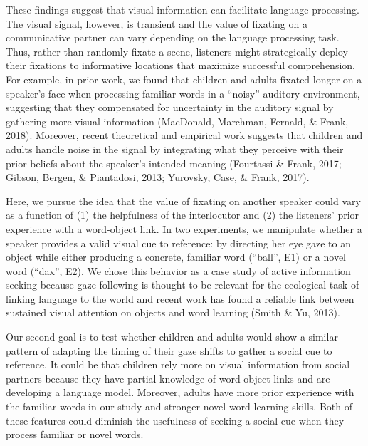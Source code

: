 \documentclass[10pt, letterpaper]{article}
\begin{document}
These findings suggest that visual information can facilitate language
processing. The visual signal, however, is transient and the value of
fixating on a communicative partner can vary depending on the language
processing task. Thus, rather than randomly fixate a scene, listeners
might strategically deploy their fixations to informative locations that
maximize successful comprehension. For example, in prior work, we found
that children and adults fixated longer on a speaker's face when
processing familiar words in a ``noisy'' auditory environment,
suggesting that they compensated for uncertainty in the auditory signal
by gathering more visual information (MacDonald, Marchman, Fernald, \&
Frank, 2018). Moreover, recent theoretical and empirical work suggests
that children and adults handle noise in the signal by integrating what
they perceive with their prior beliefs about the speaker's intended
meaning (Fourtassi \& Frank, 2017; Gibson, Bergen, \& Piantadosi, 2013;
Yurovsky, Case, \& Frank, 2017).

Here, we pursue the idea that the value of fixating on another speaker
could vary as a function of (1) the helpfulness of the interlocutor and
(2) the listeners' prior experience with a word-object link. In two
experiments, we manipulate whether a speaker provides a valid visual cue
to reference: by directing her eye gaze to an object while either
producing a concrete, familiar word (``ball'', E1) or a novel word
(``dax'', E2). We chose this behavior as a case study of active
information seeking because gaze following is thought to be relevant for
the ecological task of linking language to the world and recent work has
found a reliable link between sustained visual attention on objects and
word learning (Smith \& Yu, 2013).

Our second goal is to test whether children and adults would show a
similar pattern of adapting the timing of their gaze shifts to gather a
social cue to reference. It could be that children rely more on visual
information from social partners because they have partial knowledge of
word-object links and are developing a language model. Moreover, adults
have more prior experience with the familiar words in our study and
stronger novel word learning skills. Both of these features could
diminish the usefulness of seeking a social cue when they process
familiar or novel words.
\end{document}
